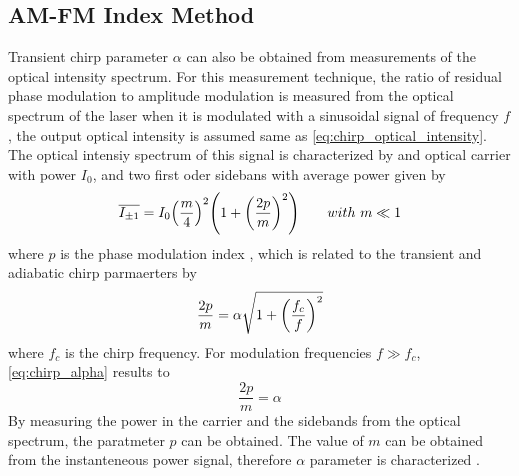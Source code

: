 \subsection{AM-FM Index Method}
Transient chirp parameter $\alpha$ can also be obtained from measurements of the optical intensity spectrum. For this measurement technique, the ratio of residual phase modulation to amplitude modulation is measured from the optical spectrum of the laser when it is modulated with a sinusoidal signal of frequency $f$, the output optical intensity is assumed same as \autoref{eq:chirp_optical_intensity}. The optical intensiy spectrum of this signal is characterized by and optical carrier with power $I_0$, and two first oder sidebans with average power given by \cite{harder1983measurement}
\begin{equation}
    \overline{I_{\pm 1}}=I_0\qty(\frac{m}{4})^2\qty(1+\qty(\frac{2p}{m})^2) \qquad with \ m \ll 1
\end{equation}
where $p$ is the phase modulation index \cite{harder1983measurement}, which is related to the transient and adiabatic chirp parmaerters by \cite{bjerkan1996measurement}
\begin{equation}
    \frac{2p}{m}=\alpha\sqrt{1+\qty(\frac{f_c}{f})^2}
    \label{eq:chirp_alpha}
\end{equation}
where $f_c$ is the chirp frequency. For modulation frequencies $f \gg f_c$, \autoref{eq:chirp_alpha} results to \cite{harder1983measurement}
\begin{equation}
    \frac{2p}{m}=\alpha
    \label{eq:chirp_alpha_2}
\end{equation}
By measuring the power in the carrier and the sidebands from the optical spectrum, the paratmeter $p$ can be obtained. The value of $m$ can be obtained from the instanteneous power signal, therefore $\alpha$ parameter is characterized \cite{harder1983measurement, villafranca2007precise}.

